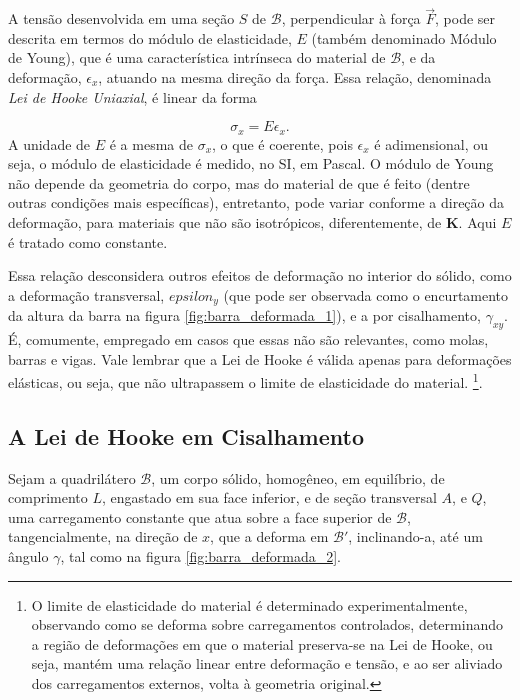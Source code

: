 A tensão desenvolvida em uma seção $S$ de $\mathcal{B}$, perpendicular à força $\vec{F}$, pode ser descrita em termos do módulo de elasticidade, $E$ (também denominado Módulo de Young), que é uma característica intrínseca do material de $\mathcal{B}$, e da deformação, $\epsilon_x$, atuando na mesma direção da força. Essa relação, denominada \emph{Lei de Hooke Uniaxial}, é linear da forma

\begin{equation}
    \sigma_x = E \epsilon_x.
    \label{eq:lei_de_hooke_uniaxial}
\end{equation} 
A unidade de $E$ é a mesma de $\sigma_x$, o que é coerente, pois $\epsilon_x$ é adimensional, ou seja, o módulo de elasticidade é medido, no SI, em Pascal. O módulo de Young não depende da geometria do corpo, mas do material de que é feito (dentre outras condições mais específicas), entretanto, pode variar conforme a direção da deformação, para materiais que não são isotrópicos, diferentemente, de $\bm{K}$. Aqui $E$ é tratado como constante.

Essa relação desconsidera outros efeitos de deformação no interior do sólido, como a deformação transversal, $epsilon_y$ (que pode ser observada como o encurtamento da altura da barra na figura \ref{fig:barra_deformada_1}), e a por cisalhamento, $\gamma_{xy}$. É, comumente, empregado em casos que essas não são relevantes, como molas, barras e vigas. Vale lembrar que a Lei de Hooke é válida apenas para deformações elásticas, ou seja, que não ultrapassem o limite de elasticidade do material. \footnote{O limite de elasticidade do material é determinado experimentalmente, observando como se deforma sobre carregamentos controlados, determinando a região de deformações em que o material preserva-se na Lei de Hooke, ou seja, mantém uma relação linear entre deformação e tensão, e ao ser aliviado dos carregamentos externos, volta à geometria original.}.

\subsection{A Lei de Hooke em Cisalhamento}

Sejam a quadrilátero $\mathcal{B}$, um corpo sólido, homogêneo, em equilíbrio, de comprimento $L$, engastado em sua face inferior, e de seção transversal $A$, e $Q$, uma carregamento constante que atua sobre a face superior de $\mathcal{B}$, tangencialmente, na direção de $x$, que a deforma em $\mathcal{B}'$, inclinando-a, até um ângulo $\gamma$, tal como na figura \ref{fig:barra_deformada_2}. 

